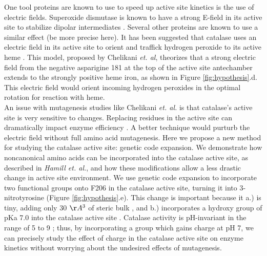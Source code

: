 \documentclass[journal=jacsat,manuscript=article]{achemso}
\begin{document}
One tool proteins are known to use to speed up active site kinetics is the use of electric fields. Superoxide dismutase is known to have a strong E-field in its active site to stabilize dipolar intermediates \cite{conserved-as-efield-sod, concentrated-as-efield-sod}. Several other proteins are known to use a similar effect \cite{efield-review} (be more precise here). It has been suggested that catalase uses an electric field in its active site to orient and traffick hydrogen peroxide to its active heme \cite{electricpotential}. This model, proposed by Chelikani \textit{et. al}, theorizes that a strong electric field from the negative asparigine 181 at the top of the active site antechamber extends to the strongly positive heme iron, as shown in Figure \ref{fig:hypothesis}.d. This electric field would orient incoming hydrogen peroxides in the optimal rotation for reaction with heme.\\

An issue with mutagenesis studies like Chelikani \textit{et. al.} is that catalase's active site is very sensitive to changes. Replacing residues in the active site can dramatically impact enzyme efficiency \cite{substrateflow}. A better technique would purturb the electric field without full amino acid mutagenesis. Here we propose a new method for studying the catalase active site: genetic code expansion. We demonstrate how noncanonical amino acids can be incorporated into the catalase active site, as described in \textit{Hamill et. al.}, and how these modifications allow a less drastic change in active site environment. We use genetic code expansion \cite{hammill} to incorporate two functional groups onto F206 in the catalase active site, turning it into 3-nitrotyrosine (Figure \ref{fig:hypothesis}.e). This change is important because it a.) is tiny, adding only 30 $\AA^3$ of steric bulk \cite{3ntsize}, and b.) incorporates a hydroxy group of pKa 7.0 into the catalase active site \cite{3ntsize}. Catalase activity is pH-invariant in the range of 5 to 9 \cite{phdependence,kcatkm}; thus, by incorporating a group which gains charge at pH 7, we can precisely study the effect of charge in the catalase active site on enzyme kinetics without worrying about the undesired effects of mutagenesis.\\
\end{document}
